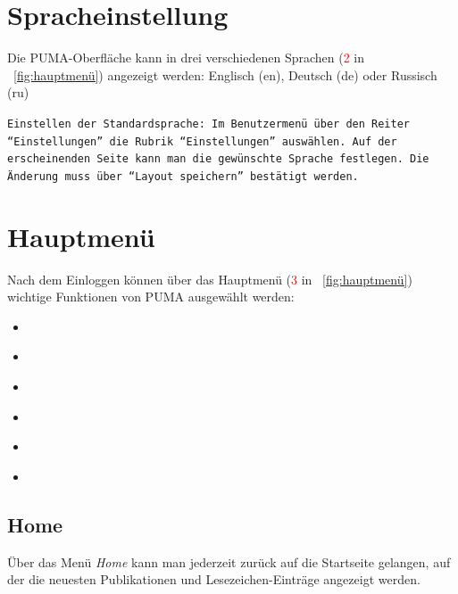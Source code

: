\section{Spracheinstellung}
\label{sec:spracheinstellung}
Die PUMA-Oberfläche kann in drei verschiedenen Sprachen (\textcolor{red}{2} in ~\autoref{fig:hauptmenü})  angezeigt werden:
Englisch (en), Deutsch (de) oder Russisch (ru)
\begin{tipp}
\texttt{Einstellen der Standardsprache: Im Benutzermenü über den Reiter \enquote{Einstellungen} die Rubrik \enquote{Einstellungen} auswählen. Auf der erscheinenden Seite kann man die gewünschte Sprache festlegen. Die Änderung muss über \enquote{Layout speichern} bestätigt werden.}
\end{tipp}
  

\section{Hauptmenü}
\label{sec:hauptmenue}
Nach dem Einloggen können über das Hauptmenü (\textcolor{red}{3} in ~\autoref{fig:hauptmenü}) wichtige Funktionen von PUMA ausgewählt werden:
\begin{itemize}
\item ~
\item ~
\item ~
\item ~
\item ~
\item ~
\end{itemize}

\subsection{Home}
\label{subsec:home}
Über das Menü \textit{Home} kann man jederzeit zurück auf die Startseite gelangen, auf der die neuesten Publikationen und Lesezeichen-Einträge angezeigt werden.

